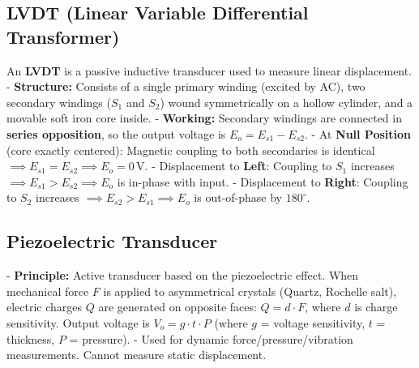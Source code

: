 \documentclass[12pt,a4paper]{article}
\begin{document}
\subsection{LVDT (Linear Variable Differential Transformer)}
An \textbf{LVDT} is a passive inductive transducer used to measure linear displacement.
- \textbf{Structure:} Consists of a single primary winding (excited by AC), two secondary windings ($S_1$ and $S_2$) wound symmetrically on a hollow cylinder, and a movable soft iron core inside.
- \textbf{Working:} Secondary windings are connected in \textbf{series opposition}, so the output voltage is $E_o = E_{s1} - E_{s2}$.
  - At \textbf{Null Position} (core exactly centered): Magnetic coupling to both secondaries is identical $\implies E_{s1} = E_{s2} \implies E_o = 0\,\text{V}$.
  - Displacement to \textbf{Left}: Coupling to $S_1$ increases $\implies E_{s1} > E_{s2} \implies E_o$ is in-phase with input.
  - Displacement to \textbf{Right}: Coupling to $S_2$ increases $\implies E_{s2} > E_{s1} \implies E_o$ is out-of-phase by $180^\circ$.

\begin{tcolorbox}[tikzbox, title={LVDT Circuit Diagram}]
\centering
{}
\end{tcolorbox}

\subsection{Piezoelectric Transducer}
- \textbf{Principle:} Active transducer based on the piezoelectric effect. When mechanical force $F$ is applied to asymmetrical crystals (Quartz, Rochelle salt), electric charges $Q$ are generated on opposite faces: $Q = d \cdot F$, where $d$ is charge sensitivity. Output voltage is $V_o = g \cdot t \cdot P$ (where $g$ = voltage sensitivity, $t$ = thickness, $P$ = pressure).
- Used for dynamic force/pressure/vibration measurements. Cannot measure static displacement.
\end{document}
